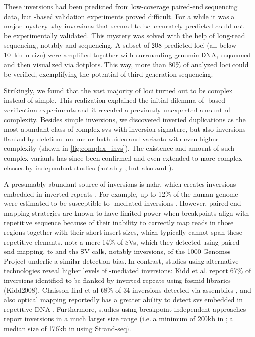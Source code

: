 These inversions had been predicted from low-coverage paired-end sequencing data,
but \pcr-based validation experiments proved difficult. For a while it was a
major mystery why inversions that seemed to be accurately predicted could not be
experimentally validated. This mystery was solved with the help of long-read
sequencing, notably \pacbio and \minion sequencing. A subset of 208 predicted
loci (all below 10~kb in size) were amplified together with surrounding genomic
DNA, sequenced and then visualized via dotplots. This way, more than 80\% of
analyzed loci could be verified, exemplifying the potential of third-generation
sequencing.

Strikingly, we found that the vast majority of loci turned out to be complex
instead of simple. This realization explained the initial dilemma of
\pcr-based verification experiments and it revealed a previously unexpected
amount of complexity. Besides simple inversions, we discovered inverted
duplications as the most abundant class of complex \acp{sv} with inversion
signature, but also inversions flanked by deletions on one or both sides and
variants with even higher complexity (shown in \cref{fig:complex_invs}). The
existence and amount of such complex variants has since been confirmed and even
extended to more complex classes by independent studies (notably
\cite{Collins2017}, but also \cite{Sanders2016} and \cite[fig. 7]{English2015}).

A presumably abundant source of inversions is \acl{nahr}, which creates
inversions embedded in inverted repeats \citep{Carvalho2016}. For example, up to
12\% of the human genome were estimated to be susceptible to \nahr-mediated
inversions \citep{Dittwald2013}. However, paired-end mapping strategies are
known to have limited power when \sv breakpoints align with repetitive sequence
because of their inability to correctly map reads in those regions together with
their short insert sizes, which typically cannot span these repetitive elements.
\citep{Korbel2007} note a mere 14\% of SVs, which they detected using paired-end
mapping, to \nahr and the SV calls, notably inversions, of the 1000 Genomes
Project underlie a similar detection bias. In contrast, studies using alternative
technologies reveal higher levels of \nahr-mediated inversions: Kidd et al.
report 67\% of inversions identified to be flanked by inverted repeats using
fosmid libraries (Kidd2008), Chaisson find et al 68\% of 34 inversions detected
via \pacbio assemblies \citep{Chaisson2014}, and also optical mapping reportedly
has a greater ability to detect \acp{sv} embedded in repetitive DNA
\citep[fig. 6]{Teague2010}. Furthermore, studies using breakpoint-independent
approaches report inversions in a much larger size range (i.e. a minimum of 200kb
in \cite{Bansal2007}; a median size of 176kb in \cite{Sanders2016} using
Strand-seq).

